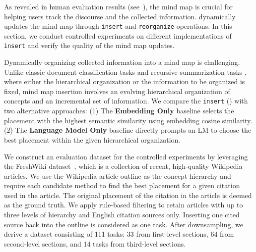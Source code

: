 \documentclass[11pt]{article}
\begin{document}
As revealed in human evaluation results (see~), the mind map is crucial for helping users track the discourse and the collected information. \system dynamically updates the mind map through \texttt{insert} and \texttt{reorganize} operations. In this section, we conduct controlled experiments on different implementations of \texttt{insert} and verify the quality of the mind map updates.

Dynamically organizing collected information into a mind map is challenging. Unlike classic document classification tasks \citep{zhang2024teleclass, zhang2023effective} and recursive summarization tasks \citep{sarthi2024raptor, gao-etal-2023-enabling}, where either the hierarchical organization or the information to be organized is fixed, mind map insertion involves an evolving hierarchical organization of concepts and an incremental set of information. We compare the \system \texttt{insert} () with two alternative approaches: (1) The \textbf{Embedding Only} baseline selects the placement with the highest semantic similarity using embedding cosine similarity. (2) The \textbf{Language Model Only} baseline directly prompts an LM to choose the best placement within the given hierarchical organization.







We construct an evaluation dataset for the controlled experiments by leveraging the FreshWiki dataset~\citep{shao2024assisting}, which is a collection of recent, high-quality Wikipedia articles. We use the Wikipedia article outline as the concept hierarchy and require each candidate method to find the best placement for a given citation used in the article. The original placement of the citation in the article is deemed as the ground truth. We apply rule-based filtering to retain articles with up to three levels of hierarchy and English citation sources only. Inserting one cited source back into the outline is considered as one task. After downsampling, we derive a dataset consisting of 111 tasks: 33 from first-level sections, 64 from second-level sections, and 14 tasks from third-level sections.
\end{document}
